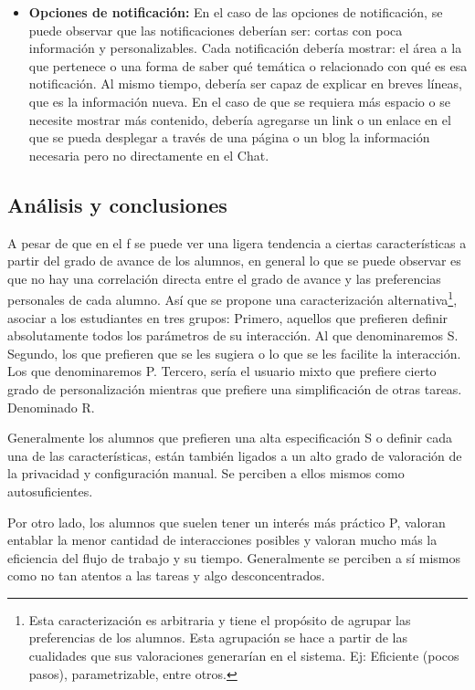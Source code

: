 \begin{itemize}
        \item \textbf{Opciones de notificación:} En el caso de las opciones de notificación, se puede observar que las notificaciones deberían ser: cortas con poca información y personalizables. Cada notificación debería mostrar: el área a la que pertenece o una forma de saber qué temática o relacionado con qué es esa notificación. Al mismo tiempo, debería ser capaz de explicar en breves líneas, que es la información nueva. En el caso de que se requiera más espacio o se necesite mostrar más contenido, debería agregarse un link o un enlace en el que se pueda desplegar a través de una página o un blog la información necesaria pero no directamente en el Chat.
        
    \end{itemize}

    \subsection{Análisis y conclusiones}\label{ayd:analsis_y_conclusiones}
    \par A pesar de que en el \acrlong{f} se puede ver una ligera tendencia a ciertas características a partir del grado de avance de los alumnos, en general lo que se puede observar es que no hay una correlación directa entre el grado de avance y las preferencias personales de cada alumno. Así que se propone una caracterización alternativa\footnote{Esta caracterización es arbitraria y tiene el propósito de agrupar las preferencias de los alumnos. Esta agrupación se hace a partir de las cualidades que sus valoraciones generarían en el sistema. Ej: Eficiente (pocos pasos), parametrizable, entre otros.}, asociar a los estudiantes en tres grupos: Primero, aquellos que prefieren definir absolutamente todos los parámetros de su interacción. Al que denominaremos \acrfull{S}. Segundo, los que prefieren que se les sugiera o lo que se les facilite la interacción. Los que denominaremos \acrfull{P}. Tercero, sería el usuario mixto que prefiere cierto grado de personalización mientras que prefiere una simplificación de otras tareas. Denominado \acrfull{R}.
    \par Generalmente los alumnos que prefieren una alta especificación \acrshort{S} o definir cada una de las características, están también ligados a un alto grado de valoración de la privacidad y configuración manual. Se perciben a ellos mismos como autosuficientes.
    \par Por otro lado, los alumnos que suelen tener un interés más práctico \acrshort{P}, valoran entablar la menor cantidad de interacciones posibles y valoran mucho más la eficiencia del flujo de trabajo y su tiempo. Generalmente se perciben a sí mismos como no tan atentos a las tareas y algo desconcentrados.
